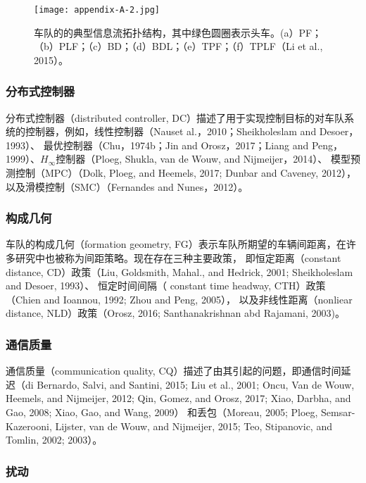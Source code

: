 \begin{translation}
\begin{figure}
  \centering
  \texttt{[image: appendix-A-2.jpg]}
  \caption{车队的的典型信息流拓扑结构，其中绿色圆圈表示头车。(a）PF；（b）PLF；（c）BD；（d）BDL；（e）TPF；（f）TPLF（Li et al., 2015）。}
  \label{fig:appendix-translation-figure2}
\end{figure}

\subsubsection{分布式控制器}

分布式控制器（distributed controller, DC）描述了用于实现控制目标的对车队系统的控制器，例如，线性控制器（Nauset al.，2010；Sheikholeslam and Desoer，1993）、
最优控制器（Chu，1974b；Jin and Orosz，2017；Liang and Peng，1999）、$H_\infty$控制器（Ploeg, Shukla, van de Wouw, and Nijmeijer，2014）、
模型预测控制（MPC）（Dolk, Ploeg, and Heemels, 2017; Dunbar and Caveney, 2012），以及滑模控制（SMC）（Fernandes and Nunes，2012）。

\subsubsection{构成几何}

车队的构成几何（formation geometry, FG）表示车队所期望的车辆间距离，在许多研究中也被称为间距策略。现在存在三种主要政策，
即恒定距离（constant distance, CD）政策（Liu, Goldsmith, Mahal., and Hedrick, 2001; Sheikholeslam and Desoer, 1993）、
恒定时间间隔（ constant time headway, CTH）政策（Chien and Ioannou, 1992; Zhou and Peng, 2005），
以及非线性距离（nonliear distance, NLD）政策（Orosz, 2016; Santhanakrishnan abd Rajamani, 2003)。

\subsubsection{通信质量}

通信质量（communication quality, CQ）描述了由其引起的问题，即通信时间延迟（di Bernardo, Salvi, and Santini, 2015; Liu et al., 2001; Oncu, Van de Wouw, 
Heemels, and Nijmeijer, 2012; Qin, Gomez, and Orosz, 2017; Xiao, Darbha, and Gao, 2008; Xiao, Gao, and Wang, 2009）
和丢包（Moreau, 2005; Ploeg, Semsar-Kazerooni, Lijster, van de Wouw, and Nijmeijer, 2015; Teo, Stipanovic, and Tomlin, 2002; 2003）。

\subsubsection{扰动}


\end{translation}
